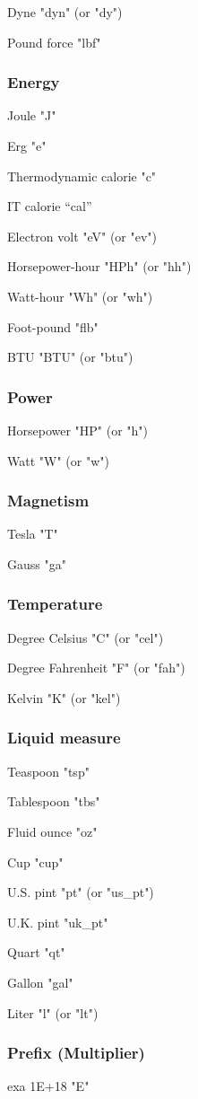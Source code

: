 Dyne "dyn" (or "dy") 

Pound force "lbf" 


\subsubsection{Energy}
Joule "J" 

Erg "e" 

Thermodynamic calorie "c" 

IT calorie "`cal"'

Electron volt "eV" (or "ev") 

Horsepower-hour "HPh" (or "hh") 

Watt-hour "Wh" (or "wh") 

Foot-pound "flb" 

BTU "BTU" (or "btu") 


\subsubsection{Power}
Horsepower "HP" (or "h") 

Watt "W" (or "w") 


\subsubsection{Magnetism}
Tesla "T" 

Gauss "ga" 


\subsubsection{Temperature}
Degree Celsius "C" (or "cel") 

Degree Fahrenheit "F" (or "fah") 

Kelvin "K" (or "kel") 


\subsubsection{Liquid measure}
Teaspoon "tsp" 

Tablespoon "tbs" 

Fluid ounce "oz" 

Cup "cup" 

U.S. pint "pt" (or "us\_pt") 

U.K. pint "uk\_pt" 

Quart "qt" 

Gallon "gal" 

Liter "l" (or "lt") 


\subsubsection{Prefix (Multiplier)}
exa 1E+18 "E" 

